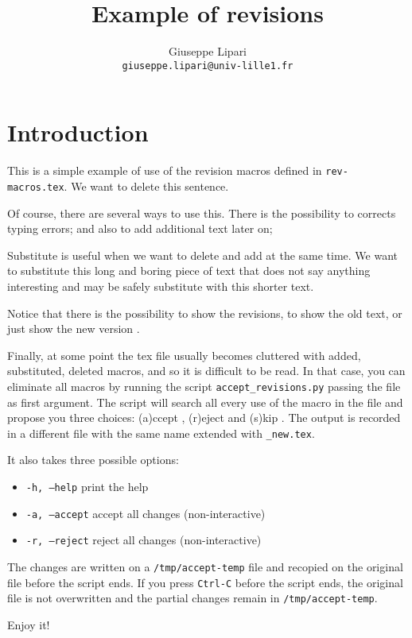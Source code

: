 \documentclass{article}
\title{Example of revisions}
\author{Giuseppe Lipari\\\texttt{giuseppe.lipari@univ-lille1.fr}}
\begin{document}
\maketitle

\section{Introduction}

This is a simple example of use of the revision
macros defined in \texttt{rev-macros.tex}. We want to delete this sentence.

Of course, there are several ways to use this. There is the
possibility to corrects typing errors; and also to add
additional text later on; 

Substitute is useful when we want to delete and add at the same
time. We want to substitute this long and boring piece of
  text that does not say anything interesting and may be safely
  substitute with this shorter text.

Notice that there is the possibility to show the revisions,  to show the
old text,  or just show the new
version .

Finally, at some point the tex file usually becomes cluttered with
added, substituted, deleted macros, and so it is difficult to be
read. In that case, you can eliminate all macros by running the
 script \texttt{accept\_revisions.py} passing the file
as first argument. The script will search all every use of the macro
in the file and propose you three choices: (a)ccept , (r)eject  and (s)kip
. 
The output is recorded in a
different file with the same name extended with \texttt{\_new.tex}.


It also takes three possible options:

\begin{itemize}
\item \texttt{-h, --help} print the help 

\item \texttt{-a, --accept} accept all changes
  (non-interactive) 
\item \texttt{-r, --reject} reject all changes (non-interactive)
\end{itemize}
The changes are written on a \texttt{/tmp/accept-temp} file and
recopied on the original file before the script ends. If you press
\texttt{Ctrl-C} before the script ends, the original file is not
overwritten and the partial changes remain in
\texttt{/tmp/accept-temp}.

Enjoy it! 
\end{document}
